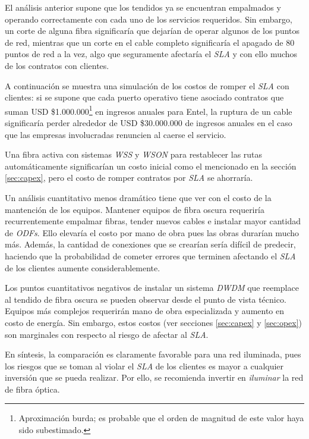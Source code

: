 El análisis anterior supone que los tendidos ya se encuentran
empalmados y operando correctamente con cada uno de los servicios
requeridos. Sin embargo, un corte de alguna fibra significaría que
dejarían de operar algunos de los puntos de red, mientras que un corte
en el cable completo significaría el apagado de 80 puntos de red a la
vez, algo que seguramente afectaría el \emph{SLA} y con ello muchos de
los contratos con clientes.

A continuación se muestra una simulación de los costos de romper el
\emph{SLA} con clientes: si se supone que cada puerto operativo tiene
asociado contratos que suman USD \$1.000.000\footnote{Aproximación
  burda; es probable que el orden de magnitud de este valor haya sido
  subestimado.} en ingresos anuales para Entel, la ruptura de un cable
significaría perder alrededor de USD \$30.000.000 de ingresos anuales
en el caso que las empresas involucradas renuncien al caerse el
servicio.

Una fibra activa con sistemas \emph{WSS} y \emph{WSON} para
restablecer las rutas automáticamente significarían un costo inicial 
como el mencionado en la sección \ref{sec:capex}, pero el
costo de romper contratos por \emph{SLA} se ahorraría.

Un análisis cuantitativo menos dramático tiene que ver con el costo de
la mantención de los equipos. Mantener equipos de fibra oscura
requeriría recurrentemente empalmar fibras, tender nuevos cables e
instalar mayor cantidad de \emph{ODFs}. Ello elevaría el costo por mano
de obra pues las obras durarían mucho más. Además, la cantidad de
conexiones que se crearían sería difícil de predecir, haciendo que la 
probabilidad de cometer errores que terminen afectando el \emph{SLA} 
de los clientes aumente considerablemente.

Los puntos cuantitativos negativos de instalar un sistema \emph{DWDM}
que reemplace al tendido de fibra oscura se pueden observar desde el
punto de vista técnico. Equipos más complejos requerirán mano de obra
especializada y aumento en costo de energía. Sin embargo, estos costos
(ver secciones \ref{sec:capex} y \ref{sec:opex}) son marginales con 
respecto al riesgo de afectar al \emph{SLA}.

En síntesis, la comparación es claramente favorable para una red 
iluminada, pues los riesgos que se toman al violar el \emph{SLA} de los
clientes es mayor a cualquier inversión que se pueda realizar. Por ello, 
se recomienda invertir en \emph{iluminar} la red de fibra óptica.

